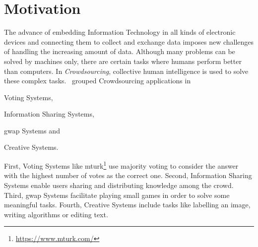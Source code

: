 
\section{Motivation}
The advance of embedding Information Technology in all kinds of electronic devices and connecting them to collect and exchange data imposes new challenges of handling the increasing amount of data. Although many problems can be solved by machines only, there are certain tasks where humans perform better than computers. In \emph{Crowdsourcing}, collective human intelligence is used to solve these complex tasks. \cite{yuen2011}~grouped Crowdsourcing applications in 
\begin{inparaenum}[1)]
		\item Voting Systems,
		\item Information Sharing Systems,
		\item \gls{gwap} Systems and
		\item Creative Systems.
\end{inparaenum} 
First, Voting Systems like \gls{mturk}\footnote{\url{https://www.mturk.com/}} use majority voting to consider the answer with the highest number of votes as the correct one. Second, Information Sharing Systems enable users sharing and distributing knowledge among the crowd. Third, \gls{gwap} Systems facilitate playing small games in order to solve some meaningful tasks. Fourth, Creative Systems include tasks like labelling an image, writing algorithms or editing text. 


